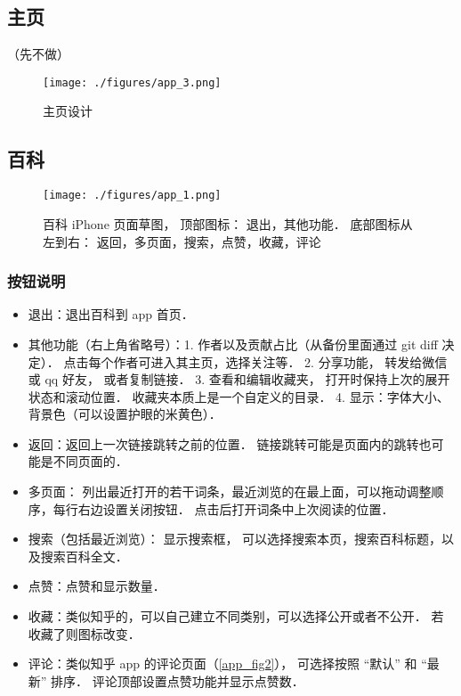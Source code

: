 
\begin{issues}
\issueDraft
\end{issues}

\subsection{主页}

（先不做）
\begin{figure}[ht]
\centering
\texttt{[image: ./figures/app\_3.png]}
\caption{主页设计} \label{app_fig3}
\end{figure}

\subsection{百科}
\begin{figure}[ht]
\centering
\texttt{[image: ./figures/app\_1.png]}
\caption{百科 iPhone 页面草图， 顶部图标： 退出，其他功能． 底部图标从左到右： 返回，多页面，搜索，点赞，收藏，评论}\label{app_fig1}
\end{figure}

\subsubsection{按钮说明}
\begin{itemize}
\item 退出：退出百科到 app 首页．
\item 其他功能（右上角省略号）：1. 作者以及贡献占比（从备份里面通过 git diff 决定）． 点击每个作者可进入其主页，选择关注等． 2. 分享功能， 转发给微信或 qq 好友， 或者复制链接． 3. 查看和编辑收藏夹， 打开时保持上次的展开状态和滚动位置． 收藏夹本质上是一个自定义的目录． 4. 显示：字体大小、 背景色（可以设置护眼的米黄色）．
\item 返回：返回上一次链接跳转之前的位置． 链接跳转可能是页面内的跳转也可能是不同页面的．
\item 多页面： 列出最近打开的若干词条，最近浏览的在最上面，可以拖动调整顺序，每行右边设置关闭按钮． 点击后打开词条中上次阅读的位置．
\item 搜索（包括最近浏览）： 显示搜索框， 可以选择搜索本页，搜索百科标题，以及搜索百科全文．
\item 点赞：点赞和显示数量．
\item 收藏：类似知乎的，可以自己建立不同类别，可以选择公开或者不公开． 若收藏了则图标改变．
\item 评论：类似知乎 app 的评论页面（\autoref{app_fig2}）， 可选择按照 “默认” 和 “最新” 排序． 评论顶部设置点赞功能并显示点赞数．
\end{itemize}

